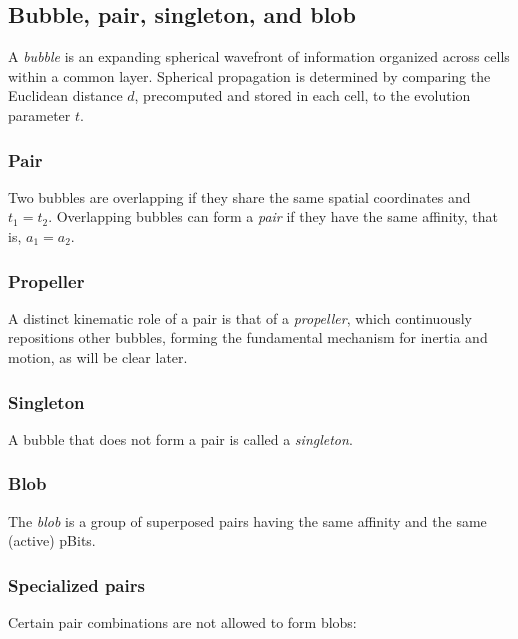 \documentclass[12pt,english]{article}
\begin{document}
\subsection{Bubble, pair, singleton, and blob} \label{subsec:pairs}

A \emph{bubble} is an expanding spherical wavefront of information organized across cells within a common layer. Spherical propagation is determined by comparing the Euclidean distance $d$, precomputed and stored in each cell, to the evolution parameter $t$. 

\subsubsection{Pair}
Two bubbles are overlapping if they share the same spatial coordinates and $t_1=t_2$. Overlapping bubbles can form a \emph{pair} if they have the same affinity, that is, $a_1=a_2$.

\subsubsection{Propeller} \label{subsubsec:propeller}
A distinct kinematic role of a pair is that of a \textit{propeller}, which continuously repositions other bubbles, forming the fundamental mechanism for inertia and motion, as will be clear later.

\subsubsection{Singleton}
A bubble that does not form a pair is called a \textit{singleton}.

\subsubsection{Blob}
The \textit{blob} is a group of superposed pairs having the same affinity and the same (active) pBits.

\subsubsection{Specialized pairs} \label{subsec:specialized-pairs}
Certain pair combinations are not allowed to form blobs: 
\end{document}
